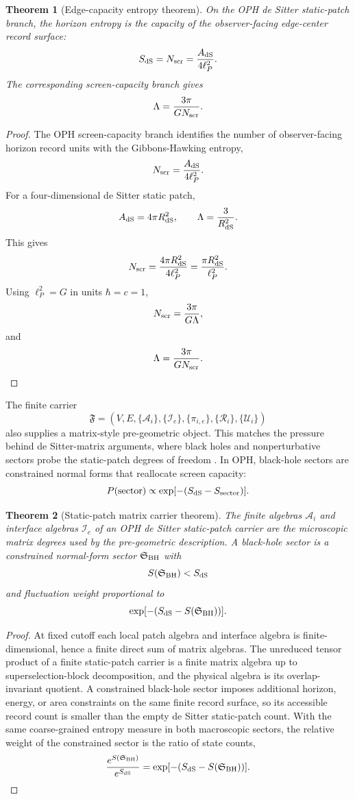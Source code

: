 \documentclass[11pt]{article}
\newtheorem{theorem}{Theorem}[section]
\theoremstyle{remark}
\theoremstyle{plain}
\newcommand{\calA}{\mathcal A}
\newcommand{\calR}{\mathcal R}
\newcommand{\calI}{\mathcal I}
\newcommand{\calU}{\mathcal U}
\begin{document}
\begin{theorem}[Edge-capacity entropy theorem]
On the OPH de Sitter static-patch branch, the horizon entropy is the capacity of the
observer-facing edge-center record surface:
\[
S_{\rm dS}=N_{\rm scr}=\frac{A_{\rm dS}}{4\ell_P^2}.
\]
The corresponding screen-capacity branch gives
\[
\Lambda=\frac{3\pi}{G N_{\rm scr}}.
\]
\end{theorem}

\begin{proof}
The OPH screen-capacity branch identifies the number of observer-facing horizon record units with
the Gibbons-Hawking entropy,
\[
N_{\rm scr}=\frac{A_{\rm dS}}{4\ell_P^2}.
\]
For a four-dimensional de Sitter static patch,
\[
A_{\rm dS}=4\pi R_{\rm dS}^2,
\qquad
\Lambda=\frac{3}{R_{\rm dS}^2}.
\]
This gives
\[
N_{\rm scr}=\frac{4\pi R_{\rm dS}^2}{4\ell_P^2}
=\frac{\pi R_{\rm dS}^2}{\ell_P^2}.
\]
Using \(\ell_P^2=G\) in units \(\hbar=c=1\),
\[
N_{\rm scr}=\frac{3\pi}{G\Lambda},
\]
and
\[
\Lambda=\frac{3\pi}{G N_{\rm scr}}.
\]
\end{proof}

The finite carrier
\[
\mathfrak F=(V,E,\{\calA_i\},\{\calI_e\},\{\pi_{i,e}\},\{\calR_i\},\{\calU_i\})
\]
also supplies a matrix-style pre-geometric object. This matches the pressure behind de
Sitter-matrix arguments, where black holes and nonperturbative sectors probe the static-patch
degrees of freedom \cite{DSMatrix2021}. In OPH, black-hole sectors are constrained normal
forms that reallocate screen capacity:
\[
P(\text{sector})\propto
\exp[-(S_{\rm dS}-S_{\rm sector})].
\]

\begin{theorem}[Static-patch matrix carrier theorem]
The finite algebras \(\calA_i\) and interface algebras \(\calI_e\) of an OPH de Sitter
static-patch carrier are the microscopic matrix degrees used by the pre-geometric description.
A black-hole sector is a constrained normal-form sector \(\mathfrak S_{\rm BH}\) with
\[
S(\mathfrak S_{\rm BH})<S_{\rm dS}
\]
and fluctuation weight proportional to
\[
\exp[-(S_{\rm dS}-S(\mathfrak S_{\rm BH}))].
\]
\end{theorem}

\begin{proof}
At fixed cutoff each local patch algebra and interface algebra is finite-dimensional, hence a finite
direct sum of matrix algebras. The unreduced tensor product of a finite static-patch carrier is a
finite matrix algebra up to superselection-block decomposition, and the physical algebra is its
overlap-invariant quotient. A constrained black-hole sector imposes additional horizon, energy, or
area constraints on the same finite record surface, so its accessible record count is smaller than
the empty de Sitter static-patch count. With the same coarse-grained entropy measure in both
macroscopic sectors, the relative weight of the constrained sector is the ratio of state counts,
\[
\frac{e^{S(\mathfrak S_{\rm BH})}}{e^{S_{\rm dS}}}
=\exp[-(S_{\rm dS}-S(\mathfrak S_{\rm BH}))].
\]
\end{proof}
\end{document}
